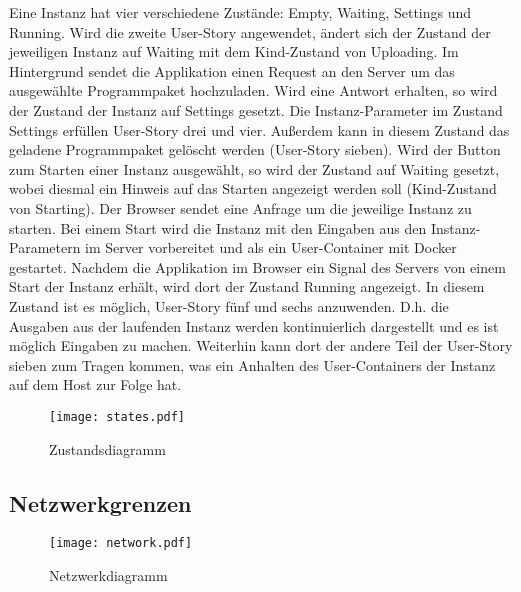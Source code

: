 Eine Instanz hat vier verschiedene Zustände: Empty, Waiting, Settings und Running.
Wird die zweite User-Story angewendet, ändert sich der Zustand der jeweiligen Instanz auf Waiting mit dem Kind-Zustand von Uploading.
Im Hintergrund sendet die Applikation einen Request an den Server um das ausgewählte Programmpaket hochzuladen.
Wird eine Antwort erhalten, so wird der Zustand der Instanz auf Settings gesetzt.
Die Instanz-Parameter im Zustand Settings erfüllen User-Story drei und vier.
Außerdem kann in diesem Zustand das geladene Programmpaket gelöscht werden (User-Story sieben).
Wird der Button zum Starten einer Instanz ausgewählt, so wird der Zustand auf Waiting gesetzt, wobei diesmal ein Hinweis auf das Starten angezeigt werden soll (Kind-Zustand von Starting).
Der Browser sendet eine Anfrage um die jeweilige Instanz zu starten.
Bei einem Start wird die Instanz mit den Eingaben aus den Instanz-Parametern im Server  vorbereitet und als ein User-Container mit Docker gestartet.
Nachdem die Applikation im Browser ein Signal des Servers von einem Start der Instanz erhält, wird dort der Zustand Running angezeigt.
In diesem Zustand ist es möglich, User-Story fünf und sechs anzuwenden.
D.h. die Ausgaben aus der laufenden Instanz werden kontinuierlich dargestellt und es ist möglich Eingaben zu machen.
Weiterhin kann dort der andere Teil der User-Story sieben zum Tragen kommen, was ein Anhalten des User-Containers der Instanz auf dem Host zur Folge hat.



\begin{landscape}
  \begin{figure}[h]
    \centering
    \texttt{[image: states.pdf]}
    \par
    \caption{Zustandsdiagramm}
    \label{fig:state}
  \end{figure}
\end{landscape}

\subsection{Netzwerkgrenzen}
  \begin{figure}[h]
    \centering
    \texttt{[image: network.pdf]}
    \caption{Netzwerkdiagramm}
    \label{fig:network}
  \end{figure}
  
